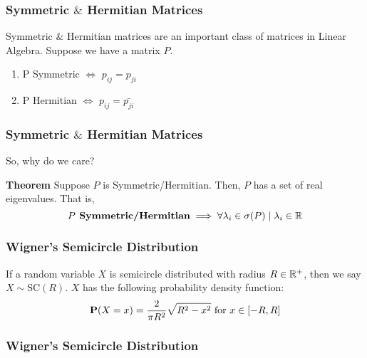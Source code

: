 \begin{frame} \frametitle{Symmetric $\&$ Hermitian Matrices}

Symmetric $\&$ Hermitian matrices are an important class of matrices in Linear Algebra.
Suppose we have a matrix $P$.

\begin{enumerate}
  \item P Symmetric $\iff$ $p_{ij} = p_{ji}$
  \item P Hermitian $\iff$ $p_{ij} = \bar{p_{ji}}$
\end{enumerate}


\end{frame}

\begin{frame} \frametitle{Symmetric $\&$ Hermitian Matrices}

So, why do we care?

\begin{alertblock}{\textbf{Theorem}}
Suppose $P$ is Symmetric/Hermitian. Then, $P$ has a set of real eigenvalues. That is,
$$P \textbf{ Symmetric/Hermitian} \implies \forall \lambda_i \in \sigma(P) \mid \lambda_i \in \mathbb{R}$$
\end{alertblock}

\end{frame}

\begin{frame} \frametitle{Wigner's Semicircle Distribution}

\begin{alertblock}{}
If a random variable $X$ is semicircle distributed with radius $R \in \mathbb{R}^+$, then we say $X \sim \text{SC}(R)$. $X$ has the following probability density function:
$$\textbf{P}(X = x) = \frac{2}{\pi R^2} \sqrt{R^2 - x^2} \text{ for } x \in [-R, R]$$
\end{alertblock}

\end{frame}

\begin{frame} \frametitle{Wigner's Semicircle Distribution}


\end{frame}

